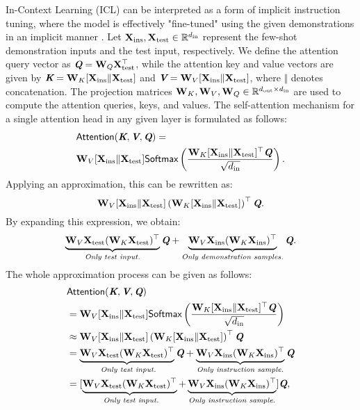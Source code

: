 In-Context Learning (ICL) can be interpreted as a form of implicit instruction tuning, where the model is effectively "fine-tuned" using the given demonstrations in an implicit manner \citep{dai2022iit1, yang2023iit2, irie2022iit3, 1-shot2023li}.  
Let $\mathbf{X_{\text{ins}}}, \mathbf{X_{\text{test}}} \in \mathbb{R}^{d_\text{in}}$ represent the few-shot demonstration inputs and the test input, respectively. 
We define the attention query vector as $\textit{\textbf{Q}} = \mathbf{W}_Q \mathbf{X_{\text{test}}^\top}$, while the attention key and value vectors are given by $\textit{\textbf{K}} = \mathbf{W}_K [\mathbf{X}_{\text{ins}} \Vert \mathbf{X}_{\text{test}} ]$ and $\textit{\textbf{V}} = \mathbf{W}_V [\mathbf{X}_{\text{ins}} \Vert \mathbf{X}_{\text{test}} ]$, where $\Vert$ denotes concatenation. 
The projection matrices $\mathbf{W}_K, \mathbf{W}_V, \mathbf{W}_Q \in \mathbb{R}^{d_\text{out} \times d_\text{in}}$ are used to compute the attention queries, keys, and values. 
The self-attention mechanism for a single attention head in any given layer is formulated as follows:
{\small
\begin{align*}
    &\textsf{Attention}(\textit{\textbf{K}}, \textit{\textbf{V}}, \textit{\textbf{Q}}) 
=  \\ &\mathbf{W}_V [\mathbf{X}_{\text{ins}} \Vert \mathbf{X}_{\text{test}} ]  \textsf{Softmax} \left(\frac{\mathbf{W}_K [\mathbf{X}_{\text{ins}} \Vert \mathbf{X}_{\text{test}} ] ^\top \textit{\textbf{Q}}} {\sqrt{ d_\text{in} }}\right).
\end{align*}
}
Applying an approximation, this can be rewritten as:
{\small
\[
\mathbf{W}_V [\mathbf{X}_{\text{ins}} \Vert \mathbf{X}_{\text{test}} ] \left(\mathbf{W}_K [\mathbf{X}_{\text{ins}} \Vert \mathbf{X}_{\text{test}}]\right) ^\top \textit{\textbf{Q}}.
\]
}
By expanding this expression, we obtain:
{\small
\[
\underbrace{\mathbf{W}_V\mathbf{X}_{\text{test}}(\mathbf{W}_K\mathbf{X}_{\text{test}})^\top}_{\textit{Only test input.}} \textit{\textbf{Q}} + \underbrace{\mathbf{W}_V\mathbf{X}_{\text{ins}}(\mathbf{W}_K\mathbf{X}_{\text{ins}})^\top}_{\textit{Only demonstration samples.}} \textit{\textbf{Q}}.
\]
}
The whole approximation process can be given as follows:
{\small
\begin{align*}
    & \textsf{Attention}(\textit{\textbf{K}}, \textit{\textbf{V}}, \textit{\textbf{Q}}) \\
    &= \mathbf{W}_V [\mathbf{X}_{\text{ins}} \Vert \mathbf{X}_{\text{test}} ]  \textsf{Softmax} \left(\frac{\mathbf{W}_K [\mathbf{X}_{\text{ins}} \Vert \mathbf{X}_{\text{test}} ] ^\top \textit{\textbf{Q}}} {\sqrt{ d_\text{in} }}\right)\\
    &\approx \mathbf{W}_V [\mathbf{X}_{\text{ins}} \Vert \mathbf{X}_{\text{test}} ] \left(\mathbf{W}_K [\mathbf{X}_{\text{ins}} \Vert \mathbf{X}_{\text{test}}]\right) ^\top \textit{\textbf{Q}} \\
    &= \underbrace{\mathbf{W}_V\mathbf{X}_{\text{test}}(\mathbf{W}_K\mathbf{X}_{\text{test}})^\top}_{\textit{ Only test input.}} \textit{\textbf{Q}} + \underbrace{\mathbf{W}_V\mathbf{X}_{\text{ins}}(\mathbf{W}_K\mathbf{X}_{\text{ins}})^\top}_{\textit{Only instruction sample.}} \textit{\textbf{Q}} \\
    &= [\underbrace{\mathbf{W}_V\mathbf{X}_{\text{test}}(\mathbf{W}_K\mathbf{X}_{\text{test}})^\top}_{\textit{ Only test input.}}  + \underbrace{\mathbf{W}_V\mathbf{X}_{\text{ins}}(\mathbf{W}_K\mathbf{X}_{\text{ins}})^\top}_{\textit{Only instruction sample.}}] \textit{\textbf{Q}},
\end{align*}
}
